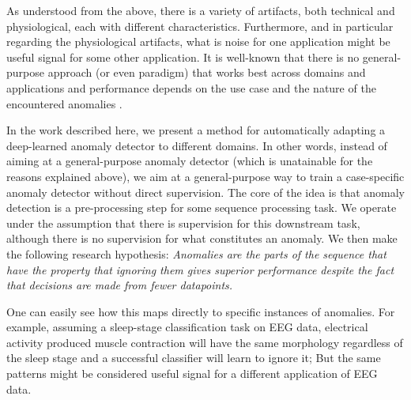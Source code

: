 \documentclass[runningheads]{llncs}
\newcommand{\deleted}[1]{\textbf{DEL:} #1}
\renewcommand{\deleted}[1]{}
\begin{document}
As understood from the above, there is a variety of artifacts, both
technical and physiological, each with different characteristics.
Furthermore, and in particular regarding the physiological artifacts,
what is noise for one application might be useful signal for some
other application. It is well-known that there is no general-purpose
approach (or even paradigm) that works best across domains and
applications and performance depends on the use case and the nature of
the encountered anomalies \cite{MEJRI2024124922}.

\deleted{As conventional approaches often struggle to provide satisfactory
results, or are limited by the need to tune their parameters for each
specific application on a case-by-case basis, recent advancements in
\emph{deep learning} have gained significant attention in the research
community \cite{MEJRI2024124922}. And, given the vagueness of what
constitutes ground truth, the most successful approaches are
unsupervised or self-supervised: \emph{forecasting-based} approaches
train a neural network to predict the next datapoint in the sequence
and \emph{reconstruction-based} approaches train a neural network to
reconstruct the sequence from a learned, compressed representation.
In either case, the assumption is that a high error between the
predicted/reconstructed sequence and the actual data is indicative of
an abnormality.}

In the work described here, we present a method for automatically
adapting a deep-learned anomaly detector to different domains. In
other words, instead of aiming at a general-purpose anomaly detector
(which is unatainable for the reasons explained above), we aim at a
general-purpose way to train a case-specific anomaly detector without
direct supervision.
The core of the idea is that anomaly detection is a pre-processing
step for some sequence processing task. We operate under the
assumption that there is supervision for this downstream task,
although there is no supervision for what constitutes an anomaly.
We then make the following research hypothesis:
\emph{Anomalies are the parts of the sequence that have the property
that ignoring them gives superior performance despite the fact that
decisions are made from fewer datapoints.}

One can easily see how this maps directly to specific instances of
anomalies. For example, assuming a sleep-stage classification task on
EEG data, electrical activity produced muscle contraction will
have the same morphology regardless of the sleep stage and a
successful classifier will learn to ignore it; But the same patterns
might be considered useful signal for a different application of EEG
data.
\end{document}

